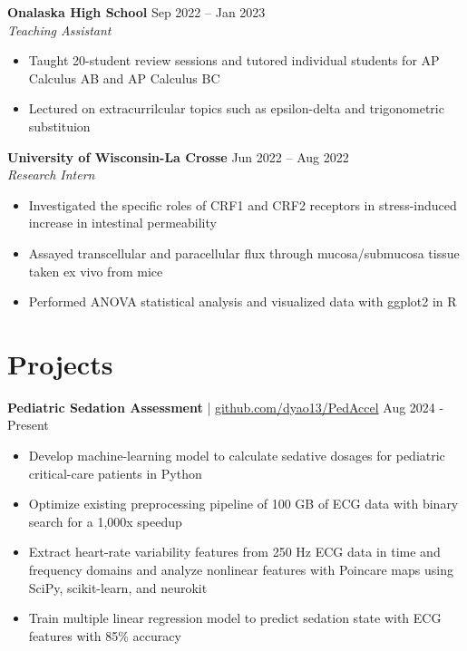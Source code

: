 \documentclass[11pt]{article}       %
\begin{document}
\textbf{Onalaska High School} \hfill Sep 2022 – Jan 2023 \\
\textit{Teaching Assistant} \vspace{-9pt} \\
\begin{itemize}
  \item Taught 20-student review sessions and tutored individual students for AP Calculus AB and AP Calculus BC
  \item Lectured on extracurrilcular topics such as epsilon-delta and trigonometric substituion
\end{itemize}

\textbf{University of Wisconsin-La Crosse} \hfill Jun 2022 – Aug 2022 \\
\textit{Research Intern} \vspace{-9pt} \\
\begin{itemize}
  \item Investigated the specific roles of CRF1 and CRF2 receptors in stress-induced increase in intestinal permeability
  \item Assayed transcellular and paracellular flux through mucosa/submucosa tissue taken ex vivo from mice
  \item Performed ANOVA statistical analysis and visualized data with ggplot2 in R
\end{itemize}

\vspace{-18.5pt}

\section*{Projects}
\textbf{Pediatric Sedation Assessment} | \href{https://github.com/dyao13/PedAccel}{github.com/dyao13/PedAccel} \hfill Aug 2024 - Present \vspace{-9pt} \\
\begin{itemize}
  \item Develop machine-learning model to calculate sedative dosages for pediatric critical-care patients in Python
  \item Optimize existing preprocessing pipeline of 100 GB of ECG data with binary search for a 1,000x speedup
  \item Extract heart-rate variability features from 250 Hz ECG data in time and frequency domains and analyze nonlinear features with Poincare maps using SciPy, scikit-learn, and neurokit
  \item Train multiple linear regression model to predict sedation state with ECG features with 85\% accuracy
\end{itemize}
\end{document}

